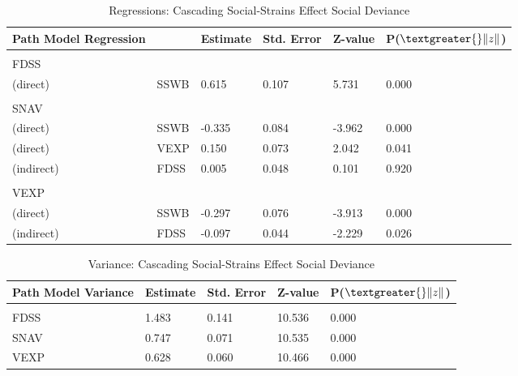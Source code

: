 \documentclass[utf8]{article}
\begin{document}
\begin{table}[]
\begin{tabular}{llllll}
Path Model Regression &      & Estimate & Std. Error & Z-value & P($\textgreater{}\|z\|$) \\ \hline
                      &      &          &            &         &                          \\
FDSS                  &      &          &            &         &                          \\
(direct)              & SSWB & 0.615    & 0.107      & 5.731   & 0.000                    \\
                      &      &          &            &         &                          \\
SNAV                  &      &          &            &         &                          \\
(direct)              & SSWB & -0.335   & 0.084      & -3.962  & 0.000                    \\
(direct)              & VEXP & 0.150    & 0.073      & 2.042   & 0.041                    \\
(indirect)            & FDSS & 0.005    & 0.048      & 0.101   & 0.920                    \\
                      &      &          &            &         &                          \\
VEXP                  &      &          &            &         &                          \\
(direct)              & SSWB & -0.297   & 0.076      & -3.913  & 0.000                    \\
(indirect)            & FDSS & -0.097   & 0.044      & -2.229  & 0.026                   
\end{tabular}
\caption{Regressions: Cascading Social-Strains Effect Social Deviance\label{tab:12}}
\end{table}

\begin{table}[]
\begin{tabular}{lllll}
Path Model Variance & Estimate & Std. Error & Z-value & P($\textgreater{}\|z\|$) \\ \hline
                    &          &            &         &                          \\
FDSS                & 1.483    & 0.141      & 10.536  & 0.000                    \\
SNAV                & 0.747    & 0.071      & 10.535  & 0.000                    \\
VEXP                & 0.628    & 0.060      & 10.466  & 0.000                   
\end{tabular}
\caption{Variance: Cascading Social-Strains Effect Social Deviance\label{tab:13}}
\end{table}
\end{document}
